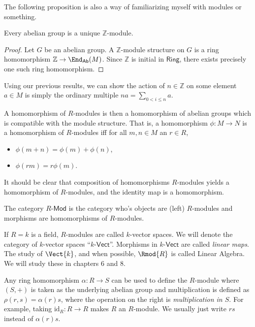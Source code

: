 The following proposition is also a way of familiarizing myself with modules or something.
\begin{proposition}\label{prp:3.5.1}
	Every abelian group is a unique $\mathbb{Z}$-module.
\end{proposition}
\begin{proof}
	Let $G$ be an abelian group. A $\mathbb{Z}$-module structure on $G$ is a ring homomorphism $\mathbb{Z}\to \End_{\mathsf{Ab}}( M ) $. Since $\mathbb{Z}$ is initial in $\mathsf{Ring}$, there exists precisely one such ring homomorphism.
\end{proof}

Using our previous results, we can show the action of $n\in\mathbb{Z}$ on some element $a\in M$ is simply the ordinary multiple $na = \sum_{0<i\leq n} a$.

A homomorphism of $R$-modules is then a homomorphism of abelian groups which is compatible with the module structure. That is, a homomorphism $\phi : M \to N$ is a homomorphism of $R$-modules iff for all $m,n\in M$ an $r\in R$,
\begin{itemize}
	\item $\phi (m+n)=\phi (m)+\phi (n)$,
	\item $\phi (rm)=r\phi (m)$.
\end{itemize}
It should be clear that composition of homomorphisms $R$-modules yields a homomorphism of $R$-modules, and the identity map is a homomorphism.
\begin{definition}\label{dfn:3.5.2}
	The category $R$-$\mathsf{Mod}$ is the category who's objects are (left) $R$-modules and morphisms are homomorphisms of $R$-modules.
\end{definition}

If $R=k$ is a field, $R$-modules are called $k$-vector spaces. We will denote the category of $k$-vector spaces ``$k$-$\mathsf{Vect}$''. Morphisms in  $k$-$\mathsf{Vect}$ are called \emph{linear maps}. The study of $\Vect{k} $, and when possible, $\Rmod{R} $ is called Linear Algebra. We will study these in chapters 6 and 8.

Any ring homomorphism $\alpha : R \to S$ can be used to define the $R$-module where $(S,+)$ is taken as the underlying abelian group and multiplication is defined as $\rho (r,s)=\alpha (r)s$, where the operation on the right is \emph{multiplication in $S$}. For example, taking $\mathrm{id}_R : R\to R$ makes $R$ an $R$-module. We usually just write $rs$ instead of $\alpha (r)s$.


